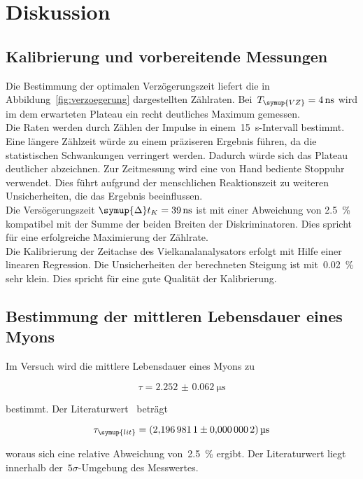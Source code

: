 \section{Diskussion}
\label{sec:diskussion}

\subsection{Kalibrierung und vorbereitende Messungen}
Die Bestimmung der optimalen Verzögerungszeit liefert die in
Abbildung~\ref{fig:verzoegerung} dargestellten Zählraten.
Bei~$T_{\symup{VZ}}=\SI{4}{\nano\second}$ wird im dem erwarteten Plateau ein recht
deutliches Maximum gemessen.\\
Die Raten werden durch Zählen der Impulse in einem~\SI{15}{\second}-Intervall
bestimmt. Eine längere Zählzeit würde zu einem präziseren Ergebnis führen, da die
statistischen Schwankungen verringert werden. Dadurch würde sich das Plateau
deutlicher abzeichnen. Zur Zeitmessung wird eine von Hand bediente Stoppuhr
verwendet. Dies führt aufgrund der menschlichen Reaktionszeit zu weiteren Unsicherheiten,
die das Ergebnis beeinflussen.\\
Die Versögerungszeit $\symup{\Delta}t_K = \SI{39}{\nano\second}$ ist
mit einer Abweichung von \SI{2.5}{\percent} kompatibel mit der Summe der beiden
Breiten der Diskriminatoren. Dies spricht für eine erfolgreiche Maximierung der
Zählrate.\\
Die Kalibrierung der Zeitachse des Vielkanalanalysators erfolgt mit Hilfe einer
linearen Regression. Die Unsicherheiten der berechneten Steigung ist
mit~\SI{0.02}{\percent} sehr klein. Dies spricht für eine gute Qualität der
Kalibrierung. 

\subsection{Bestimmung der mittleren Lebensdauer eines Myons}
Im Versuch wird die mittlere Lebensdauer eines Myons zu

\begin{equation}
  \tau=\SI{2.252(62)}{\micro\second}
\end{equation}

bestimmt. Der Literaturwert~\cite{pdg} beträgt

\begin{equation}
  \tau_{\symup{lit}}=\SI{2.1969811(2)}{\micro\second}
\end{equation}

woraus sich eine relative Abweichung von~\SI{2.5}{\percent} ergibt. Der
Literaturwert liegt innerhalb der~$5\sigma$-Umgebung des Messwertes.


